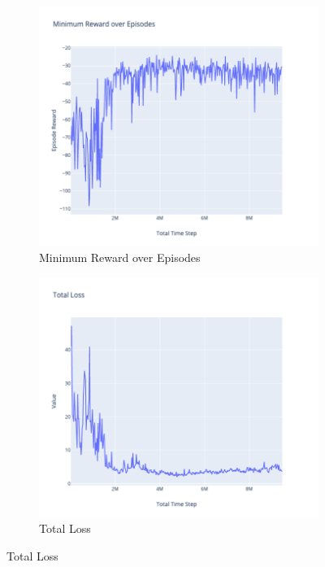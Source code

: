 \begin{figure}[!htb]
		\begin{subfigure}[!htb]{0.35\textwidth}
				\centering
				\includegraphics[width=\textwidth]{figures/exps/1st_exp/min_eps_reward}
				\caption{Minimum Reward over Episodes}
				\label{fig:min_eps_reward}
		\end{subfigure}
		\hfill
		\begin{subfigure}[!htb]{0.35\textwidth}
				\centering
				\includegraphics[width=\textwidth]{figures/exps/1st_exp/total_loss}
				\caption{Total Loss}
				\label{fig:total_loss}
		\end{subfigure}
		\hfill


\end{figure}
